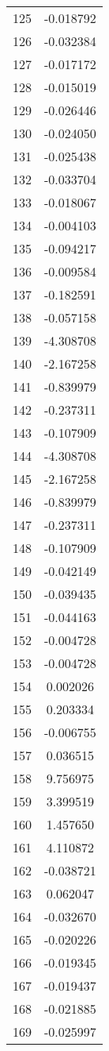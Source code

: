 \documentclass[12pt]{article}
\begin{document}
\begin{longtable}{@{}cc@{}}
125 & -0.018792 \\
126 & -0.032384 \\
127 & -0.017172 \\
128 & -0.015019 \\
129 & -0.026446 \\
130 & -0.024050 \\
131 & -0.025438 \\
132 & -0.033704 \\
133 & -0.018067 \\
134 & -0.004103 \\
135 & -0.094217 \\
136 & -0.009584 \\
137 & -0.182591 \\
138 & -0.057158 \\
139 & -4.308708 \\
140 & -2.167258 \\
141 & -0.839979 \\
142 & -0.237311 \\
143 & -0.107909 \\
144 & -4.308708 \\
145 & -2.167258 \\
146 & -0.839979 \\
147 & -0.237311 \\
148 & -0.107909 \\
149 & -0.042149 \\
150 & -0.039435 \\
151 & -0.044163 \\
152 & -0.004728 \\
153 & -0.004728 \\
154 & 0.002026 \\
155 & 0.203334 \\
156 & -0.006755 \\
157 & 0.036515 \\
158 & 9.756975 \\
159 & 3.399519 \\
160 & 1.457650 \\
161 & 4.110872 \\
162 & -0.038721 \\
163 & 0.062047 \\
164 & -0.032670 \\
165 & -0.020226 \\
166 & -0.019345 \\
167 & -0.019437 \\
168 & -0.021885 \\
169 & -0.025997 \\

\end{longtable}
\end{document}
